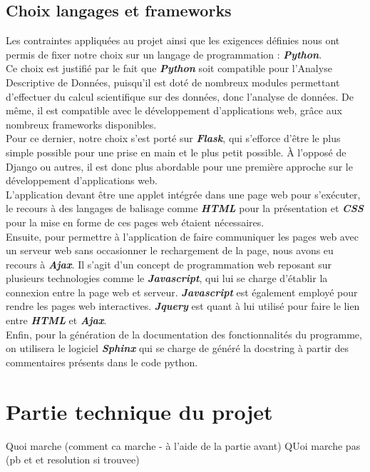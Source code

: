 			
		\subsection{Choix langages et frameworks}
			Les contraintes appliquées au projet ainsi que les exigences définies nous ont permis de fixer notre choix sur un langage de programmation : \textbf{\textit{Python}}.\\
			Ce choix est justifié par le fait que \textbf{\textit{Python}} soit compatible pour l'Analyse Descriptive de Données, puisqu'il est doté de nombreux modules permettant d'effectuer du calcul scientifique sur des données, donc l'analyse de données. De même, il est compatible avec le développement d'applications web, grâce aux nombreux frameworks disponibles.\\
			 Pour ce dernier, notre choix s'est porté sur \textbf{\textit{Flask}}, qui s’efforce d’être le plus simple possible pour une prise en main et le plus petit possible. À l'opposé de Django ou autres, il est donc plus abordable pour une première approche sur le développement d'applications web.\\
			
			L'application devant être une applet intégrée dans une page web pour s'exécuter, le recours à des langages de balisage comme \textbf{\textit{HTML}} pour la présentation et \textbf{\textit{CSS}} pour la mise en forme de ces pages web étaient nécessaires.\\
			
			Ensuite, pour permettre à l'application de faire communiquer les pages web avec un serveur web sans occasionner le rechargement de la page, nous avons eu recours à \textbf{\textit{Ajax}}. Il s'agit d'un concept de programmation web reposant sur plusieurs technologies comme le \textbf{\textit{Javascript}}, qui lui se charge d'établir la connexion entre la page web et serveur. \textbf{\textit{Javascript}} est également employé pour rendre les pages web interactives. \textbf{\textit{Jquery}} est quant à lui utilisé pour faire le lien entre \textbf{\textit{HTML}} et \textbf{\textit{Ajax}}.\\
			
			Enfin, pour la génération de la documentation des fonctionnalités du programme, on utilisera le logiciel \textbf{\textit{Sphinx}} qui se charge de généré la docstring à partir des commentaires présents dans le code python.\\
		
	\section{Partie technique du projet}
		Quoi marche (comment ca marche - à l'aide de la partie avant)
		QUoi marche pas (pb et et resolution si trouvee)
		
